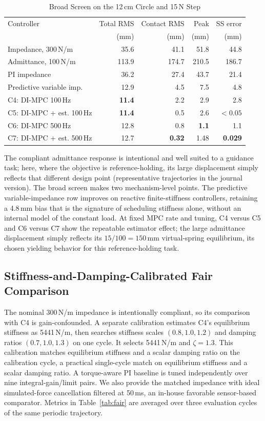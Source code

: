 \documentclass[conference]{IEEEtran}
\begin{document}
\begin{table}[t]
\caption{Broad Screen on the 12\,cm Circle and 15\,N Step}
\label{tab:broad}
\centering
\footnotesize
\setlength{\tabcolsep}{2.0pt}
\begin{tabular}{@{}lrrrr@{}}
\toprule
Controller & Total RMS & Contact RMS & Peak & SS error\\
 & (mm) & (mm) & (mm) & (mm)\\
\midrule
Impedance, 300\,N/m & 35.6 & 41.1 & 51.8 & 44.8\\
Admittance, 100\,N/m & 113.9 & 174.7 & 210.5 & 186.7\\
PI impedance & 36.2 & 27.4 & 43.7 & 21.4\\
Predictive variable imp. & 12.9 & 4.5 & 7.5 & 4.8\\
C4: DI-MPC 100\,Hz & \textbf{11.4} & 2.2 & 2.9 & 2.8\\
C5: DI-MPC + est. 100\,Hz & \textbf{11.4} & 0.5 & 2.6 & $<0.05$\\
C6: DI-MPC 500\,Hz & 12.8 & 0.8 & \textbf{1.1} & 1.1\\
C7: DI-MPC + est. 500\,Hz & 12.7 & \textbf{0.32} & 1.48 & \textbf{0.029}\\
\bottomrule
\end{tabular}
\end{table}

The compliant admittance response is intentional and well suited to a
guidance task; here, where the objective is reference-holding, its large
displacement simply reflects that different design point
(representative trajectories in the journal version). The broad screen makes two mechanism-level points. The predictive
variable-impedance row improves on reactive finite-stiffness controllers,
retaining a 4.8\,mm bias that is the signature of scheduling stiffness
alone, without an internal model of the constant load. At fixed MPC rate and tuning, C4 versus C5
and C6 versus C7 show the repeatable estimator effect; the large admittance
displacement simply reflects its $15/100=150$\,mm virtual-spring equilibrium,
its chosen yielding behavior for this reference-holding task.

\subsection{Stiffness-and-Damping-Calibrated Fair Comparison}

The nominal 300\,N/m impedance is intentionally compliant, so its comparison
with C4 is gain-confounded. A separate calibration estimates C4's equilibrium
stiffness as 5441\,N/m, then searches stiffness scales
$(0.8,1.0,1.2)$ and damping ratios $(0.7,1.0,1.3)$ on one cycle. It selects
5441\,N/m and $\zeta=1.3$. This calibration matches equilibrium stiffness
and a scalar damping ratio on the calibration cycle, a practical
single-cycle match on equilibrium stiffness and a scalar damping ratio. A
torque-aware PI baseline is tuned independently over nine
integral-gain/limit pairs. We also provide the matched impedance with
ideal simulated-force cancellation filtered at 50\,ms, an in-house
favorable sensor-based comparator. Metrics in Table~\ref{tab:fair} are
averaged over three evaluation cycles of the same periodic trajectory.
\end{document}
